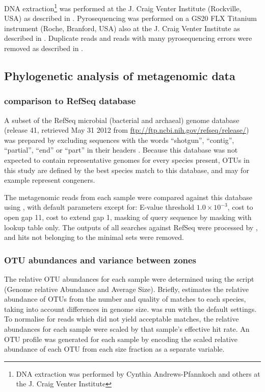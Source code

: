 DNA extraction\footnote{DNA extraction was performed by Cynthia Andrews-Pfannkoch and others at the J. Craig Venter Institute} was performed at the J. Craig Venter Institute (Rockville, USA) as described in \citet{Rusch:2007ez}.
Pyrosequencing was performed on a GS20 FLX Titanium instrument (Roche, Branford, USA) also at the J. Craig Venter Institute as described in \citet{Lauro:2010jna}.
Duplicate reads and reads with many pyrosequencing errors were removed as described in \citet{Lauro:2010jna}.

\subsection{Phylogenetic analysis of metagenomic data}

\subsubsection{ comparison to RefSeq database}

A subset of the RefSeq microbial (bacterial and archaeal) genome database (release 41, retrieved May 31 2012 from \url{ftp://ftp.ncbi.nih.gov/refseq/release/}) was prepared by excluding sequences with the words ``shotgun'', ``contig'', ``partial'', ``end'' or ``part'' in their headers \cite{Angly:2009ip}.
Because this database was not expected to contain representative genomes for every species present, \acp{OTU} in this study are defined by the best species match to this database, and may for example represent congeners.

The metagenomic reads from each sample were compared against this database using , with default parameters except for: E-value threshold $1.0\times{}10^{-3}$, cost to open gap 11, cost to extend gap 1, masking of query sequence by  masking with lookup table only.
The outputs of all  searches against RefSeq were processed by , and hits not belonging to the minimal sets were removed.

\subsubsection{\ac{OTU} abundances and variance between zones}

The relative \ac{OTU} abundances for each sample were determined using the  script  (Genome relative Abundance and Average Size)\cite{Angly:2009ip}.
Briefly,  estimates the relative abundance of \acp{OTU} from the number and quality of  matches to each species, taking into account differences in genome size. 
 was run with the default settings. 
To normalise for reads which did not yield acceptable matches, the relative abundances for each sample were scaled by that sample's effective  hit rate. 
An \ac{OTU} profile was generated for each sample by encoding the scaled relative abundance of each \ac{OTU} from each size fraction as a separate variable.

